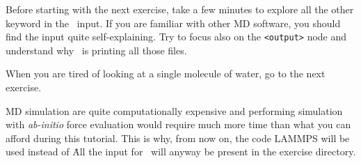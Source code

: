 \documentclass{article}
\begin{document}
Before starting with the next exercise, take a few minutes to explore
all the other keyword in the \ipi\ input. If you are familiar with
other MD software, you should find the input quite self-explaining.
Try to focus also on the \texttt{<output>} node and understand why
\ipi\ is printing all those files.


When you are tired of looking at a single molecule of water, go to the
next exercise. 

MD simulation are quite computationally expensive and performing
simulation with \emph{ab-initio} force evaluation would require much
more time than what you can afford during this tutorial. This is why,
from now on, the code LAMMPS will be used instead of \qe\. All the
input for \qe\ will anyway be present in the exercise directory.

\vspace{2em}
\end{document}
